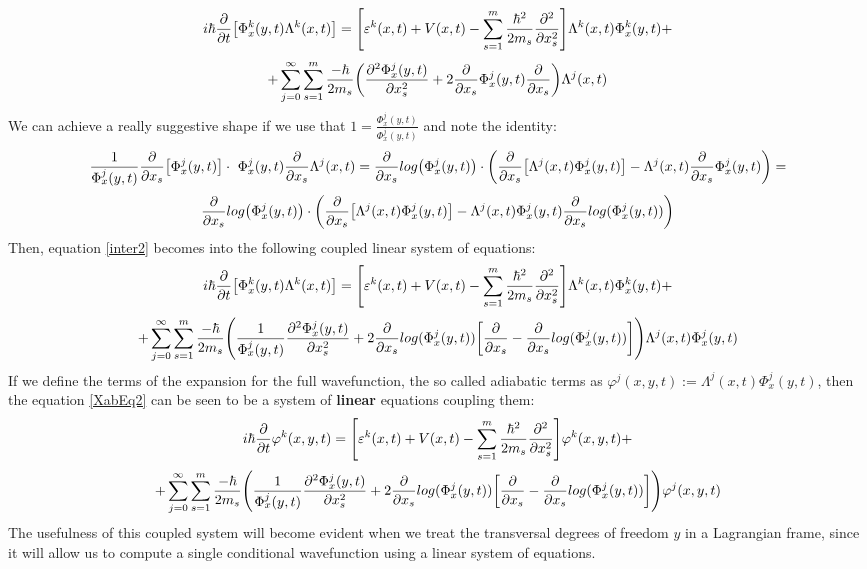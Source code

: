 \documentclass[11pt, a4paper]{article} %
\begin{document}
\begin{equation}\label{inter2}
 i\hbar\pdv{}{t}\qty[ \Phi^k_x(y,t)\Lambda^k(x,t)]=\qty[ \varepsilon^k(x,t)+V(x,t)  -\sum_{s=1}^m\frac{\hbar^2}{2m_s}\pdv[2]{}{x_s} ]\Lambda^k(x,t)\Phi^k_x(y,t)+
\end{equation}
$$
+\sum_{j=0}^\infty\sum_{s=1}^m \frac{-\hbar}{2m_s}\qty( \pdv[2]{\Phi^j_x(y,t)}{x_s}+2\pdv{}{x_s}\Phi^j_x(y,t)\pdv{}{x_s} )\Lambda^j(x,t)
$$
We can achieve a really suggestive shape if we use that $1=\frac{\Phi^j_x(y,t)}{\Phi^j_x(y,t)}$ and note the identity:
\begin{equation}
\frac{1}{\Phi^j_x(y,t)}\pdv{}{x_s}\qty[\Phi^j_x(y,t)]\cdot\ \Phi^j_x(y,t)\pdv{}{x_s}\Lambda^j(x,t)=\pdv{}{x_s}log\qty(\Phi^j_x(y,t))\cdot \qty(\pdv{}{x_s}\qty[\Lambda^j(x,t)\Phi^j_x(y,t)]-\Lambda^j(x,t)\pdv{}{x_s}\Phi^j_x(y,t) )=
\end{equation}
$$
\pdv{}{x_s}log\qty(\Phi^j_x(y,t))\cdot \qty(\pdv{}{x_s}\qty[\Lambda^j(x,t)\Phi^j_x(y,t)]-\Lambda^j(x,t)\Phi^j_x(y,t)\pdv{}{x_s}log(\Phi^j_x(y,t)) )
$$
Then, equation \eqref{inter2} becomes into the following coupled linear system of equations:
\begin{equation}\label{XabEq2}
 i\hbar\pdv{}{t}\qty[ \Phi^k_x(y,t)\Lambda^k(x,t)]=\qty[ \varepsilon^k(x,t)+V(x,t)  -\sum_{s=1}^m\frac{\hbar^2}{2m_s}\pdv[2]{}{x_s} ]\Lambda^k(x,t)\Phi^k_x(y,t)+
\end{equation}
$$
+\sum_{j=0}^\infty\sum_{s=1}^m \frac{-\hbar}{2m_s}\qty( \frac{1}{\Phi^j_x(y,t)}\pdv[2]{\Phi^j_x(y,t)}{x_s}+2\pdv{}{x_s}log(\Phi^j_x(y,t))\qty[\pdv{}{x_s}-\pdv{}{x_s}log(\Phi^j_x(y,t))] )\Lambda^j(x,t)\Phi^j_x(y,t)
$$
If we define the terms of the expansion for the full wavefunction, the so called adiabatic terms as $\varphi^j(x,y,t):=\Lambda^j(x,t)\Phi^j_x(y,t)$, then the equation \eqref{XabEq2} can be seen to be a system of {\bf linear} equations coupling them:
\begin{equation}\label{XabEq2.5}
 i\hbar\pdv{}{t}\varphi^k(x,y,t)=\qty[ \varepsilon^k(x,t)+V(x,t)  -\sum_{s=1}^m\frac{\hbar^2}{2m_s}\pdv[2]{}{x_s} ]\varphi^k(x,y,t)+
\end{equation}
$$
+\sum_{j=0}^\infty\sum_{s=1}^m \frac{-\hbar}{2m_s}\qty( \frac{1}{\Phi^j_x(y,t)}\pdv[2]{\Phi^j_x(y,t)}{x_s}+2\pdv{}{x_s}log(\Phi^j_x(y,t))\qty[\pdv{}{x_s}-\pdv{}{x_s}log(\Phi^j_x(y,t))] )\varphi^j(x,y,t)
$$
The usefulness of this coupled system will become evident when we treat the transversal degrees of freedom $y$ in a Lagrangian frame, since it will allow us to compute a single conditional wavefunction using a linear system of equations.
\end{document}
